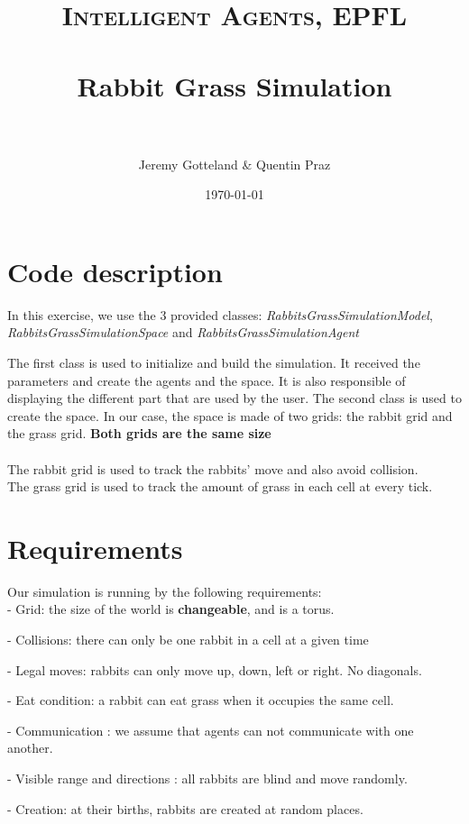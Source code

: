 \documentclass[fontsize=11pt]{scrartcl} %
\title{	
\normalfont \normalsize 
\textsc{Intelligent Agents, EPFL} \\ [20pt] %
\horrule{0.5pt} \\[0.4cm] %
\huge Rabbit Grass Simulation \\ %
\horrule{2pt} \\[0.5cm] %
}
\author{Jeremy Gotteland \& Quentin Praz} %
\date{\normalsize\today} %
\begin{document}
\maketitle %


\section*{Code description}
In this exercise, we use the 3 provided classes: \textit{RabbitsGrassSimulationModel}, \textit{RabbitsGrassSimulationSpace} and  \textit{RabbitsGrassSimulationAgent}

The first class is used to initialize and build the simulation. It received the parameters and create the agents and the space. It is also responsible of displaying the different part that are used by the user. The second class is used to create the space. In our case, the space is made of two grids: the rabbit grid and the grass grid. \textbf{Both grids are the same size} \\ \\
The rabbit grid is used to track the rabbits' move and also avoid collision. \\
The grass grid is used to track the amount of grass in each cell at every tick. 

\section*{Requirements}
Our simulation is running by the following requirements: \\


- Grid: the size of the world is \textbf{changeable}, and is a torus.

- Collisions: there can only be one rabbit in a cell at a given time

- Legal moves: rabbits can only move up, down, left or right. No diagonals.

- Eat condition: a rabbit can eat grass when it occupies the same cell.

- Communication : we assume that agents can not communicate with one another.

- Visible range and directions : all rabbits are blind and move randomly.

- Creation: at their births, rabbits are created at random places.
\end{document}
